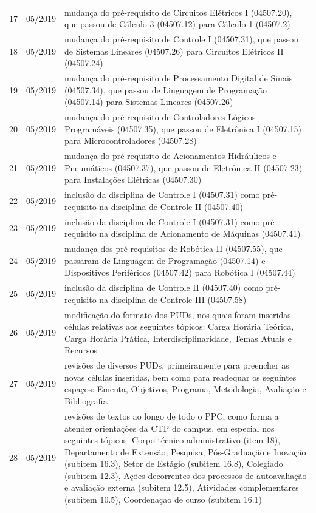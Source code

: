 \begin{center}
\begin{longtable}{lp{2cm}p{11cm}}
		17 & 05/2019 & mudança do pré-requisito de Circuitos Elétricos I (04507.20), que passou de Cálculo 3 (04507.12) para Cálculo 1 (04507.2) \\
		18 & 05/2019 & mudança do pré-requisito de Controle I (04507.31), que passou de Sistemas Lineares (04507.26) para Circuitos Elétricos II (04507.24) \\
		19 & 05/2019 & mudança do pré-requisito de Processamento Digital de Sinais (04507.34), que passou de Linguagem de Programação (04507.14) para Sistemas Lineares (04507.26) \\
		20 & 05/2019 & mudança do pré-requisito de Controladores Lógicos Programáveis (04507.35), que passou de Eletrônica I (04507.15) para Microcontroladores (04507.28) \\
		21 & 05/2019 & mudança do pré-requisito de Acionamentos Hidráulicos e Pneumáticos (04507.37), que passou de Eletrônica II (04507.23) para Instalações Elétricas (04507.30) \\
		22 & 05/2019 & inclusão da disciplina de Controle I (04507.31) como pré-requisito na disciplina de Controle II (04507.40) \\
		23 & 05/2019 & inclusão da disciplina de Controle I (04507.31) como pré-requisito na disciplina de Acionamento de Máquinas (04507.41) \\
		24 & 05/2019 & mudança dos pré-requisitos de Robótica II (04507.55), que passaram de Linguagem de Programação (04507.14) e Dispositivos Periféricos (04507.42) para Robótica I (04507.44) \\
		25 & 05/2019 & inclusão da disciplina de Controle II (04507.40) como pré-requisito na disciplina de Controle III (04507.58) \\
		26 & 05/2019 & modificação do formato dos PUDs, nos quais foram inseridas células relativas aos seguintes tópicos: Carga Horária Teórica, Carga Horária Prática, Interdisciplinaridade, Temas Atuais e Recursos \\
		27 & 05/2019 & revisões de diversos PUDs, primeiramente para preencher as novas células inseridas, bem como para readequar os seguintes espaços: Ementa, Objetivos, Programa, Metodologia, Avaliação e Bibliografia \\
		28 & 05/2019 & revisões de textos ao longo de todo o PPC, como forma a atender orientações da CTP do campus, em especial nos seguintes tópicos: Corpo técnico-administrativo (item 18), Departamento de Extensão, Pesquisa, Pós-Graduação e Inovação (subitem 16.3), Setor de Estágio (subitem 16.8), Colegiado (subitem 12.3), Ações decorrentes dos processos de autoavaliação e avaliação externa (subitem 12.5), Atividades complementares (subitem 10.5), Coordenaçao de curso (subitem 16.1) \\

\end{longtable}
\end{center}
